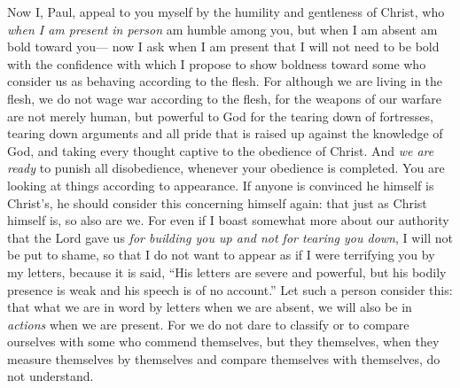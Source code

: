 \begin{biblechapter} %
 Now I, Paul, appeal to you myself by the humility and gentleness of Christ, who \textit{when I am present in person} am humble among you, but when I am absent am bold toward you—
\verse now I ask when I am present that I will not need to be bold with the confidence with which I propose to show boldness toward some who consider us as behaving according to the flesh.
\verse For although we are living in the flesh, we do not wage war according to the flesh,
\verse for the weapons of our warfare are not merely human, but powerful to God for the tearing down of fortresses, tearing down arguments
\verse and all pride that is raised up against the knowledge of God, and taking every thought captive to the obedience of Christ.
\verse And \textit{we are ready} to punish all disobedience, whenever your obedience is completed.
\verse You are looking at things according to appearance. If anyone is convinced he himself is Christ’s, he should consider this concerning himself again: that just as Christ himself is, so also are we.
\verse For even if I boast somewhat more about our authority that the Lord gave us \textit{for building you up and not for tearing you down}, I will not be put to shame,
\verse so that I do not want to appear as if I were terrifying you by my letters,
\verse because it is said, “His letters are severe and powerful, but his bodily presence is weak and his speech is of no account.”
\verse Let such a person consider this: that what we are in word by letters when we are absent, we will also be in \textit{actions} when we are present.
\verse For we do not dare to classify or to compare ourselves with some who commend themselves, but they themselves, when they measure themselves by themselves and compare themselves with themselves, do not understand.

\end{biblechapter}
